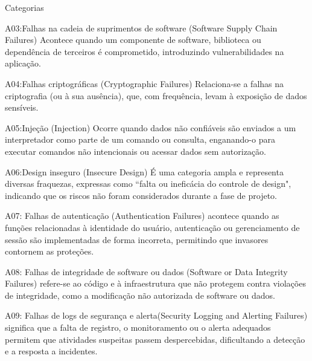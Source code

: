 \documentclass{if-beamer}
\begin{document}
\begin{frame}[allowframebreaks]{Categorias}
		\framebreak

		\begin{block}{A03:Falhas na cadeia de suprimentos de software (Software Supply Chain Failures)}
		 Acontece quando um componente de software, 
		 biblioteca ou dependência de terceiros é comprometido, introduzindo vulnerabilidades na aplicação.
		\end{block}

		\begin{block}{A04:Falhas criptográficas (Cryptographic Failures)}
		 Relaciona-se a falhas na criptografia (ou à sua ausência), que, com 
		 frequência, levam à exposição de dados sensíveis.
		\end{block}
		
		\framebreak

		\begin{block}{A05:Injeção (Injection)}
		Ocorre quando dados não confiáveis são enviados a um interpretador como parte de um comando ou consulta,
		 enganando-o para executar comandos não intencionais ou acessar dados sem autorização.
		\end{block}

		\begin{block}{A06:Design inseguro (Insecure Design)}
		 É uma categoria ampla e representa diversas fraquezas, expressas como ``falta ou ineficácia
		  do controle de design", indicando que os riscos não foram considerados durante a fase de projeto.
		\end{block}
		
		\framebreak

		\begin{block}{A07: Falhas de autenticação (Authentication Failures)}
		acontece quando as funções relacionadas à identidade do usuário, autenticação ou gerenciamento de sessão são implementadas de 
		forma incorreta, permitindo que invasores contornem as proteções.
		\end{block}

		\begin{block}{A08: Falhas de integridade de software ou dados (Software or Data Integrity Failures)}
		 refere-se ao código e à infraestrutura que não protegem contra violações de integridade, como a modificação não autorizada de software ou dados.
		\end{block}
		
		\framebreak

		\begin{block}{A09: Falhas de logs de segurança e alerta(Security Logging and Alerting Failures)}
		significa que a falta de registro, o monitoramento ou o alerta adequados permitem que atividades suspeitas passem despercebidas,
		 dificultando a detecção e a resposta a incidentes.
		\end{block}


\end{frame}
\end{document}
